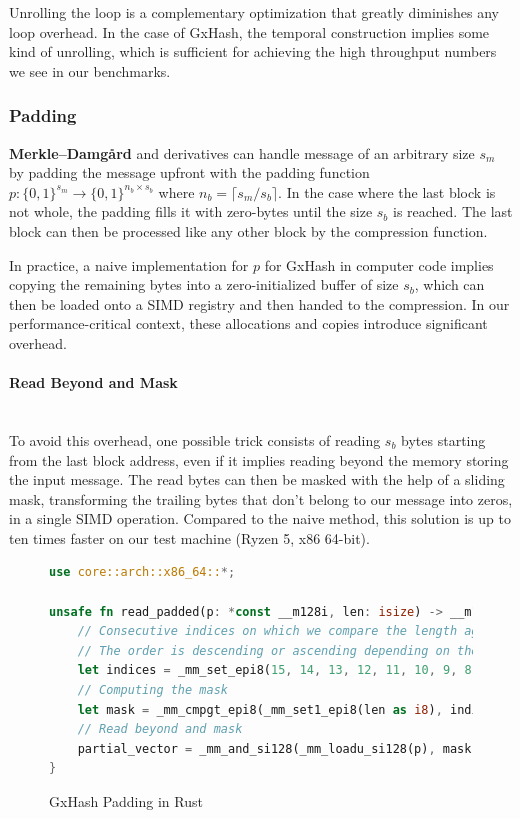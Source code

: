 \documentclass[10pt]{article}
\begin{document}
Unrolling the loop is a complementary optimization that greatly diminishes any loop overhead. In the case of GxHash, the temporal construction implies some kind of unrolling, which is sufficient for achieving the high throughput numbers we see in our benchmarks.

\subsubsection{Padding}

\textbf{Merkle–Damgård} and derivatives can handle message of an arbitrary size \( s_m \) by padding the message upfront with the padding function \( p: \{0,1\}^{s_m} \to \{0,1\}^{n_b \times s_b} \) where \( n_b = \lceil s_m/s_b \rceil \). In the case where the last block is not whole, the padding fills it with zero-bytes until the size \( s_b \) is reached. The last block can then be processed like any other block by the compression function.

In practice, a naive implementation for \( p \) for GxHash in computer code implies copying the remaining bytes into a zero-initialized buffer of size \( s_b \), which can then be loaded onto a SIMD registry and then handed to the compression. In our performance-critical context, these allocations and copies introduce significant overhead.

\paragraph{Read Beyond and Mask}\leavevmode\\
To avoid this overhead, one possible trick consists of reading \( s_b \) bytes starting from the last block address, even if it implies reading beyond the memory storing the input message. The read bytes can then be masked with the help of a sliding mask, transforming the trailing bytes that don't belong to our message into zeros, in a single SIMD operation. Compared to the naive method, this solution is up to ten times faster on our test machine (Ryzen 5, x86 64-bit).

\begin{figure}[H]
\begin{lstlisting}[language=Rust, style=boxed]
use core::arch::x86_64::*;

unsafe fn read_padded(p: *const __m128i, len: isize) -> __m128i {
    // Consecutive indices on which we compare the length against, byte per byte, to retrieve our mask.
    // The order is descending or ascending depending on the endianness
    let indices = _mm_set_epi8(15, 14, 13, 12, 11, 10, 9, 8, 7, 6, 5, 4, 3, 2, 1, 0);
    // Computing the mask
    let mask = _mm_cmpgt_epi8(_mm_set1_epi8(len as i8), indices);
    // Read beyond and mask
    partial_vector = _mm_and_si128(_mm_loadu_si128(p), mask);
}
\end{lstlisting}
\caption{GxHash Padding in Rust}
\label{fig:read_beyond_example}
\end{figure}
\end{document}
